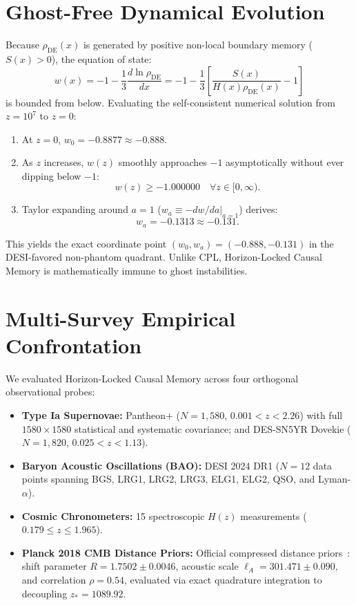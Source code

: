 \documentclass[10pt,twocolumn]{article}
\begin{document}
\section{Ghost-Free Dynamical Evolution}
Because $\rho_{\mathrm{DE}}(x)$ is generated by positive non-local boundary memory ($S(x) > 0$), the equation of state:
\begin{equation}
w(x) = -1 - \frac{1}{3}\frac{d\ln \rho_{\mathrm{DE}}}{dx} = -1 - \frac{1}{3}\left[\frac{S(x)}{H(x)\rho_{\mathrm{DE}}(x)} - 1\right]
\end{equation}
is bounded from below. Evaluating the self-consistent numerical solution from $z = 10^7$ to $z = 0$:
\begin{enumerate}
\item At $z = 0$, $w_0 = -0.8877 \approx -0.888$.
\item As $z$ increases, $w(z)$ smoothly approaches $-1$ asymptotically without ever dipping below $-1$:
\begin{equation}
w(z) \ge -1.000000 \quad \forall z \in [0, \infty).
\end{equation}
\item Taylor expanding around $a = 1$ ($w_a \equiv -dw/da|_{a=1}$) derives:
\begin{equation}
w_a = -0.1313 \approx -0.131.
\end{equation}
\end{enumerate}
This yields the exact coordinate point $(w_0, w_a) = (-0.888, -0.131)$ in the DESI-favored non-phantom quadrant. Unlike CPL, Horizon-Locked Causal Memory is mathematically immune to ghost instabilities.

\section{Multi-Survey Empirical Confrontation}
We evaluated Horizon-Locked Causal Memory across four orthogonal observational probes:
\begin{itemize}
\item \textbf{Type Ia Supernovae:} Pantheon+ ($N=1,580$, $0.001 < z < 2.26$) with full $1580 \times 1580$ statistical and systematic covariance; and DES-SN5YR Dovekie ($N=1,820$, $0.025 < z < 1.13$).
\item \textbf{Baryon Acoustic Oscillations (BAO):} DESI 2024 DR1 ($N=12$ data points spanning BGS, LRG1, LRG2, LRG3, ELG1, ELG2, QSO, and Lyman-$\alpha$).
\item \textbf{Cosmic Chronometers:} 15 spectroscopic $H(z)$ measurements ($0.179 \le z \le 1.965$).
\item \textbf{Planck 2018 CMB Distance Priors:} Official compressed distance priors~\cite{chen2019}: shift parameter $R = 1.7502 \pm 0.0046$, acoustic scale $\ell_A = 301.471 \pm 0.090$, and correlation $\rho = 0.54$, evaluated via exact quadrature integration to decoupling $z_* = 1089.92$.
\end{itemize}
\end{document}
